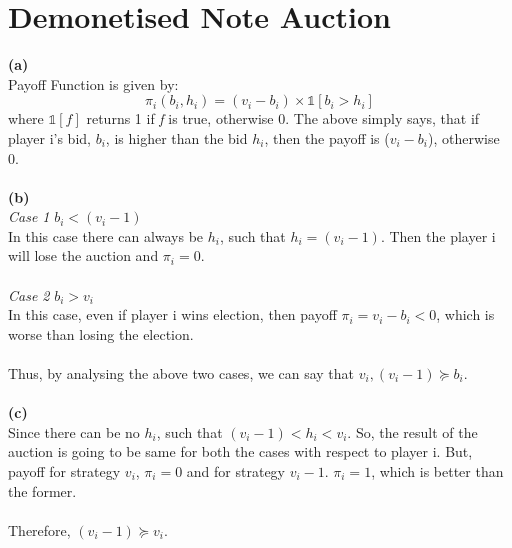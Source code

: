 \documentclass{article}
\begin{document}
\section{Demonetised Note Auction}
\textbf{(a)} \\
Payoff Function is given by:
$$\pi_i(b_i,h_i) = (v_i-b_i) \times \mathds{1}[b_i > h_i]$$
where $\mathds{1}[f]$ returns 1 if \emph{f} is true, otherwise 0. The above simply says, that if player i's bid, $b_i$, is higher than the bid $h_i$, then the payoff is ($v_i-b_i$), otherwise 0.\\ \\
\textbf{(b)} \\
\emph{Case 1} $b_i< (v_i-1)$ \\
In this case there can always be $h_i$, such that $h_i=(v_i-1)$. Then the player i will lose the auction and $\pi_i = 0$. \\ \\
\emph{Case 2} $b_i > v_i$ \\
In this case, even if player i wins election, then payoff $\pi_i = v_i - b_i < 0$, which is worse than losing the election. \\ \\
Thus, by analysing the above two cases, we can say that $v_i,(v_i-1) \succeq b_i$. \\ \\
\textbf{(c)} \\
Since there can be no $h_i$, such that $(v_i-1)< h_i < v_i$. So, the result of the auction is going to be same for both the cases with respect to player i. But, payoff for strategy $v_i$, $\pi_i = 0$ and for strategy $v_i-1$. $\pi_i = 1$, which is better than the former. \\ \\
Therefore, $(v_i-1) \succeq v_i$.
\end{document}
